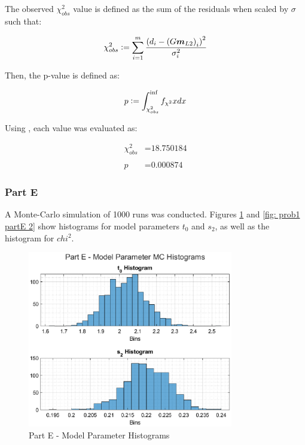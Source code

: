 The observed $\chi^2_{obs}$ value is defined as the sum of the residuals when scaled by $\sigma$ such that:

\begin{align*}
	\chi^2_{obs} \vcentcolon= \sum_{i=1}^{m} \frac{\left(d_i - \left(G \boldsymbol{m}_{L2}\right)_i \right)^2}{\sigma_i^2}
\end{align*}

Then, the p-value is defined as:

\begin{align*}
	p \vcentcolon= \int_{\chi^2_{obs}}^{\inf} f_{\chi^2} x dx
\end{align*}

Using \MATLAB, each value was evaluated as:

\begin{align*}
	\chi^2_{obs} &= \textrm{18.750184} \\
	\\
	p &= \textrm{0.000874}
\end{align*}


\subsubsection{Part E}

A Monte-Carlo simulation of 1000 runs was conducted. Figures \ref{fig: prob1 partE 1} and \ref{fig: prob1 partE 2} show histograms for model parameters $t_0$ and $s_2$, as well as the histogram for $chi^2$.

\begin{figure}[h] 
	\centering
	\includegraphics[width=0.8\textwidth]{./images/prob1_partE_1.eps}
	\caption{Part E - Model Parameter Histograms}
	\label{fig: prob1 partE 1}
\end{figure}
\FloatBarrier

